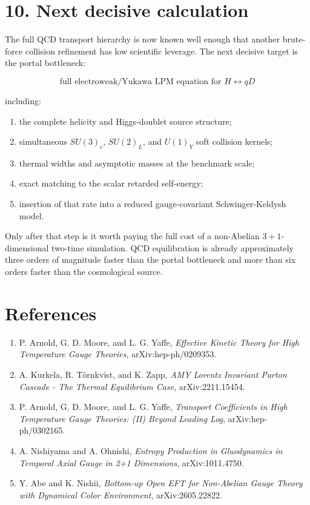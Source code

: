 \documentclass[
  10pt,
]{article}
\providecommand{\tightlist}{%
  \setlength{\itemsep}{0pt}\setlength{\parskip}{0pt}}
\begin{document}
\section{10. Next decisive calculation}\label{next-decisive-calculation}

The full QCD transport hierarchy is now known well enough that another
brute-force collision refinement has low scientific leverage. The next
decisive target is the portal bottleneck:

\[
\boxed{
\text{full electroweak/Yukawa LPM equation for }H\leftrightarrow qD
}
\]

including:

\begin{enumerate}
\def\labelenumi{\arabic{enumi}.}
\tightlist
\item
  the complete helicity and Higgs-doublet source structure;
\item
  simultaneous \(SU(3)_c\), \(SU(2)_L\), and \(U(1)_Y\) soft collision
  kernels;
\item
  thermal widths and asymptotic masses at the benchmark scale;
\item
  exact matching to the scalar retarded self-energy;
\item
  insertion of that rate into a reduced gauge-covariant
  Schwinger-Keldysh model.
\end{enumerate}

Only after that step is it worth paying the full cost of a non-Abelian
\(3+1\)-dimensional two-time simulation. QCD equilibration is already
approximately three orders of magnitude faster than the portal
bottleneck and more than six orders faster than the cosmological source.

\section{References}\label{references}

\begin{enumerate}
\def\labelenumi{\arabic{enumi}.}
\tightlist
\item
  P. Arnold, G. D. Moore, and L. G. Yaffe, \emph{Effective Kinetic
  Theory for High Temperature Gauge Theories}, arXiv:hep-ph/0209353.
\item
  A. Kurkela, R. Törnkvist, and K. Zapp, \emph{AMY Lorentz Invariant
  Parton Cascade - The Thermal Equilibrium Case}, arXiv:2211.15454.
\item
  P. Arnold, G. D. Moore, and L. G. Yaffe, \emph{Transport Coefficients
  in High Temperature Gauge Theories: (II) Beyond Leading Log},
  arXiv:hep-ph/0302165.
\item
  A. Nishiyama and A. Ohnishi, \emph{Entropy Production in Gluodynamics
  in Temporal Axial Gauge in 2+1 Dimensions}, arXiv:1011.4750.
\item
  Y. Abe and K. Nishii, \emph{Bottom-up Open EFT for Non-Abelian Gauge
  Theory with Dynamical Color Environment}, arXiv:2605.22822.
\end{enumerate}
\end{document}
